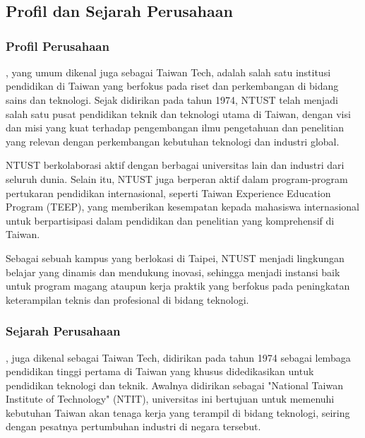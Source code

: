 \chapter{\babDua}

\section{Profil dan Sejarah Perusahaan}

\subsection{Profil Perusahaan}
\namaUniv, yang umum dikenal juga sebagai Taiwan Tech, adalah salah satu institusi pendidikan di Taiwan yang berfokus pada riset dan perkembangan di bidang sains dan teknologi. Sejak didirikan pada tahun 1974, NTUST telah menjadi salah satu pusat pendidikan teknik dan teknologi utama di Taiwan, dengan visi dan misi yang kuat terhadap pengembangan ilmu pengetahuan dan penelitian yang relevan dengan perkembangan kebutuhan teknologi dan industri global.

NTUST berkolaborasi aktif dengan berbagai universitas lain dan industri dari seluruh dunia. Selain itu, NTUST juga berperan aktif dalam program-program pertukaran pendidikan internasional, seperti Taiwan Experience Education Program (TEEP), yang memberikan kesempatan kepada mahasiswa internasional untuk berpartisipasi dalam pendidikan dan penelitian yang komprehensif di Taiwan.

Sebagai sebuah kampus yang berlokasi di Taipei, NTUST menjadi lingkungan belajar yang dinamis dan mendukung inovasi, sehingga menjadi instansi baik untuk program magang ataupun kerja praktik yang berfokus pada peningkatan keterampilan teknis dan profesional di bidang teknologi.

\subsection{Sejarah Perusahaan}
\namaUniv, juga dikenal sebagai Taiwan Tech, didirikan pada tahun 1974 sebagai lembaga pendidikan tinggi pertama di Taiwan yang khusus didedikasikan untuk pendidikan teknologi dan teknik. Awalnya didirikan sebagai "National Taiwan Institute of Technology" (NTIT), universitas ini bertujuan untuk memenuhi kebutuhan Taiwan akan tenaga kerja yang terampil di bidang teknologi, seiring dengan pesatnya pertumbuhan industri di negara tersebut.

